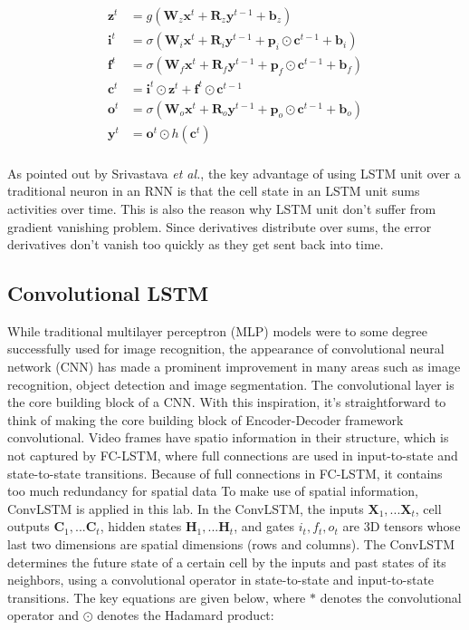 \documentclass[twoside,a4paper,article]{combine}
\begin{document}
\begin{align*}
    \mathbf{z}^t &= g(\mathbf{W}_z\mathbf{x}^t + \mathbf{R}_z\mathbf{y}^{t-1} + \mathbf{b}_z) \\
    \mathbf{i}^t &= \sigma(\mathbf{W}_i\mathbf{x}^t + \mathbf{R}_i\mathbf{y}^{t-1} + \mathbf{p}_i\odot\mathbf{c}^{t-1}+ \mathbf{b}_i) \\
    \mathbf{f}^t &= \sigma(\mathbf{W}_f\mathbf{x}^t + \mathbf{R}_f\mathbf{y}^{t-1} + \mathbf{p}_f\odot\mathbf{c}^{t-1}+ \mathbf{b}_f) \\
    \mathbf{c}^t &= \mathbf{i}^t\odot\mathbf{z}^t + \mathbf{f}^t\odot\mathbf{c}^{t-1} \\
    \mathbf{o}^t &= \sigma(\mathbf{W}_o\mathbf{x}^t + \mathbf{R}_o\mathbf{y}^{t-1} + \mathbf{p}_o\odot\mathbf{c}^{t-1}+ \mathbf{b}_o) \\
    \mathbf{y}^t &= \mathbf{o}^t \odot h(\mathbf{c}^t) \\
\end{align*}

As pointed out by Srivastava \emph{et al.}, the key advantage of using LSTM unit over a traditional neuron in an RNN is that the cell state
in an LSTM unit sums activities over time. This is also the reason why LSTM unit don't suffer from gradient vanishing problem. Since
derivatives distribute over sums, the error derivatives don't vanish too quickly as they get sent back into time.

\subsection{Convolutional LSTM}
While traditional multilayer perceptron (MLP) models were to some degree successfully used for image recognition, the appearance of
convolutional neural network (CNN) has made a prominent improvement in many areas such as image recognition, object detection and image
segmentation. The convolutional layer is the core building block of a CNN. With this inspiration, it's straightforward to think of making
the core building block of Encoder-Decoder framework convolutional.
Video frames have spatio information in their structure, which is not captured by FC-LSTM, where full connections are used in
input-to-state and state-to-state transitions. Because of full connections in FC-LSTM, it contains too much redundancy for spatial data
To make use of spatial information, ConvLSTM is applied in this lab. In the ConvLSTM, the
inputs $\bm{X}_1,...\bm{X}_t$, cell outputs $\bm{C}_1,...\bm{C}_t$, hidden states $\bm{H}_1,...\bm{H}_t$, and gates $i_t,f_t,o_t$ are 3D
tensors whose last two dimensions are spatial dimensions (rows and columns). The ConvLSTM determines the future state of a certain cell
by the inputs and past states of its neighbors, using a convolutional operator in state-to-state and input-to-state transitions. The key
equations are given below, where $\ast$ denotes the convolutional operator and $\odot$ denotes the Hadamard product:
\end{document}
